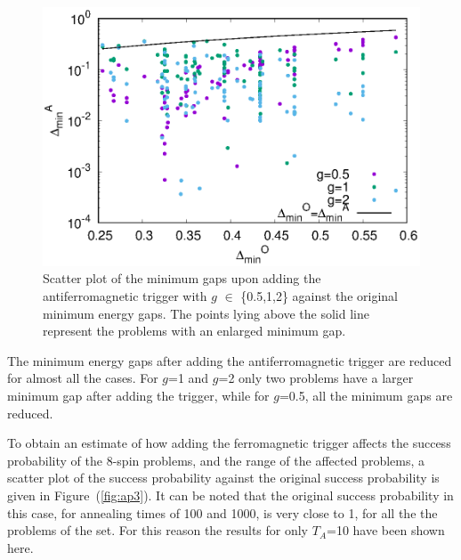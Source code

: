 \documentclass[../main.tex]{subfiles}
\begin{document}
\begin{appendices}
\begin{figure}[H]
\centering 
\includegraphics[scale=0.8]{Mingap_A_8.eps}
\caption{Scatter plot of the minimum gaps upon adding the antiferromagnetic trigger with $g$ $\in$ \{0.5,1,2\} against the original minimum energy gaps. The points lying above the solid line represent the problems with an enlarged minimum gap.}
\label{fig:ap2}
\end{figure}
The minimum energy gaps after adding the antiferromagnetic trigger are reduced for almost all the cases. For $g$=1 and $g$=2 only two problems have a larger minimum gap after adding the trigger, while for $g$=0.5, all the minimum gaps are reduced.

To obtain an estimate of how adding the ferromagnetic trigger affects the success probability of the 8-spin problems, and the range of the affected problems, a scatter plot of the success probability against the original success probability is given in Figure~(\ref{fig:ap3}). It can be noted that the original success probability in this case, for annealing times of 100 and 1000, is very close to 1, for all the the problems of the set. For this reason the results for only $T_A$=10 have been shown here.


\end{appendices}
\end{document}
